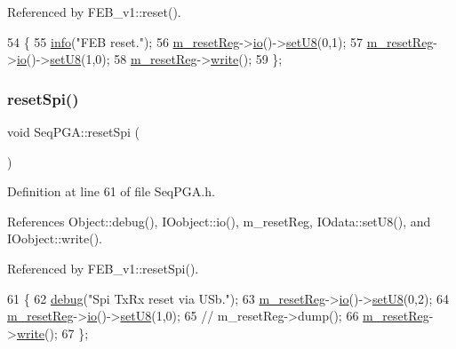 Referenced by F\+E\+B\+\_\+v1\+::reset().


\begin{DoxyCode}
54                \{
55     \hyperlink{classObject_a644fd329ea4cb85f54fa6846484b84a8}{info}(\textcolor{stringliteral}{"FEB reset."});
56     \hyperlink{classSeqPGA_a8c519e98b992ab872622e95dae4461d8}{m\_resetReg}->\hyperlink{classIOobject_af04fb94137c3d86849f478ac5afab5d1}{io}()->\hyperlink{classIOdata_a6c4fb2f2af01889ada889c2b7aceb24d}{setU8}(0,1);
57     \hyperlink{classSeqPGA_a8c519e98b992ab872622e95dae4461d8}{m\_resetReg}->\hyperlink{classIOobject_af04fb94137c3d86849f478ac5afab5d1}{io}()->\hyperlink{classIOdata_a6c4fb2f2af01889ada889c2b7aceb24d}{setU8}(1,0);
58     \hyperlink{classSeqPGA_a8c519e98b992ab872622e95dae4461d8}{m\_resetReg}->\hyperlink{classIOobject_a9f6984bc9f0fadcf800f1be2523ac744}{write}();
59   \};
\end{DoxyCode}
\mbox{\label{classSeqPGA_a52f122a1767691eb950a4aae5981edfc}} 
\subsubsection{\texorpdfstring{reset\+Spi()}{resetSpi()}}
{\footnotesize\ttfamily void Seq\+P\+G\+A\+::reset\+Spi (\begin{DoxyParamCaption}{ }\end{DoxyParamCaption})\hspace{0.3cm}{\ttfamily [inline]}}



Definition at line 61 of file Seq\+P\+G\+A.\+h.



References Object\+::debug(), I\+Oobject\+::io(), m\+\_\+reset\+Reg, I\+Odata\+::set\+U8(), and I\+Oobject\+::write().



Referenced by F\+E\+B\+\_\+v1\+::reset\+Spi().


\begin{DoxyCode}
61                   \{
62     \hyperlink{classObject_aac010553f022165573714b7014a15f0d}{debug}(\textcolor{stringliteral}{"Spi TxRx reset via USb."});
63     \hyperlink{classSeqPGA_a8c519e98b992ab872622e95dae4461d8}{m\_resetReg}->\hyperlink{classIOobject_af04fb94137c3d86849f478ac5afab5d1}{io}()->\hyperlink{classIOdata_a6c4fb2f2af01889ada889c2b7aceb24d}{setU8}(0,2);
64     \hyperlink{classSeqPGA_a8c519e98b992ab872622e95dae4461d8}{m\_resetReg}->\hyperlink{classIOobject_af04fb94137c3d86849f478ac5afab5d1}{io}()->\hyperlink{classIOdata_a6c4fb2f2af01889ada889c2b7aceb24d}{setU8}(1,0);
65     \textcolor{comment}{//    m\_resetReg->dump();}
66     \hyperlink{classSeqPGA_a8c519e98b992ab872622e95dae4461d8}{m\_resetReg}->\hyperlink{classIOobject_a9f6984bc9f0fadcf800f1be2523ac744}{write}();
67   \};
\end{DoxyCode}
\mbox{\label{classElement_ab476b4b1df5954141ceb14f072433b89}} 
